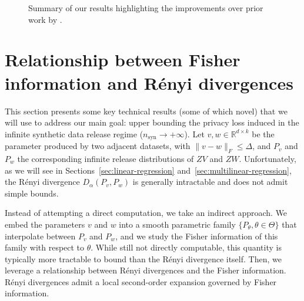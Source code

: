 \documentclass{article}
\theoremstyle{plain}
\theoremstyle{definition}
\theoremstyle{remark}
\begin{document}
\begin{figure}[t]
\caption{Summary of our results highlighting the improvements over prior work by \citet{pierquin2025}.}
\label{fig:summary}
\end{figure}



  


\section{Relationship between Fisher information and Rényi divergences}
\label{sec:fisher-renyi}
This section presents some key technical results (some of which novel) that we will use to address our main goal:
upper bounding the privacy loss induced in the infinite synthetic data release regime ($n_{\text{syn}}\rightarrow+\infty$). Let $v,w \in \mathbb{R}^{d\times k}$ be the parameter produced by two adjacent datasets, with $\|v-w\|_F \leq \Delta$, and $P_v$ and $P_w$ the corresponding infinite release distributions of $ZV$ and $ZW$. Unfortunately, as we will see in Sections~\ref{sec:linear-regression} and~\ref{sec:multilinear-regression}, the Rényi divergence $D_\alpha(P_v, P_w)$ is generally intractable and does not admit simple bounds.

Instead of attempting a direct computation, we take an indirect approach. We embed the parameters $v$ and $w$ into a smooth parametric family $\{P_{\theta}, \theta \in \Theta\}$ that interpolate between $P_v$ and $P_w$, and we study the Fisher information of this family with respect to $\theta$. While still not directly computable, this quantity is typically more tractable to bound than the Rényi divergence itself. Then, we leverage a relationship between Rényi divergences and the Fisher information. Rényi divergences admit a local second-order expansion governed by Fisher information.
\end{document}
